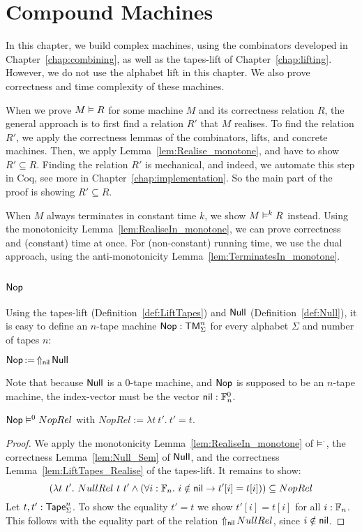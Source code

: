 \chapter{Compound Machines}
\label{chap:compound}

In this chapter, we build complex machines, using the combinators developed in Chapter~\ref{chap:combining}, as well as the tapes-lift of
Chapter~\ref{chap:lifting}.  However, we do not use the alphabet lift in this chapter.  We also prove correctness and time complexity of these
machines.

When we prove $M \mathrel{\vDash} R$ for some machine $M$ and its correctness relation $R$, the general approach is to first find a relation $R'$ that $M$
realises.  To find the relation $R'$, we apply the correctness lemmas of the combinators, lifts, and concrete machines.  Then, we apply
Lemma~\ref{lem:Realise_monotone}, and have to show $R' \subseteq R$.  Finding the relation $R'$ is mechanical, and indeed, we automate this step in
Coq, see more in Chapter~\ref{chap:implementation}.  So the main part of the proof is showing $R' \subseteq R$.

When $M$ always terminates in constant time $k$, we show $M \mathrel{\vDash^{k}} R$ instead.  Using the monotonicity Lemma~\ref{lem:RealiseIn_monotone}, we
can prove correctness and (constant) time at once.  For (non-constant) running time, we use the dual approach, using the anti-monotonicity
Lemma~\ref{lem:TerminatesIn_monotone}.


\section{$\Nop$}
\label{sec:Nop}
%


Using the tapes-lift (Definition~\ref{def:LiftTapes}) and $\mathsf{Null}$ (Definition~\ref{def:Null}), it is easy to define an $n$-tape machine
$\mathsf{Nop} : \mathsf{TM}_\Sigma^n$ for every alphabet $\Sigma$ and number of tapes $n$:
\begin{definition}[$\Nop$][Nop]
  $\mathsf{Nop} \mathop{:=} \mathop{\Uparrow_{\mathsf{nil}}} \mathsf{Null}$
\end{definition}
Note that because $\mathsf{Null}$ is a 0-tape machine, and $\Nop$ is supposed to be an $n$-tape machine, the index-vector must be the vector
$\mathsf{nil} : \mathbb{F}_n^0$.

\begin{lemma}
  \label{lem:Nop_Sem}
  $\mathsf{Nop} \mathrel{\vDash^{0}} NopRel$ with $NopRel := \lambda t~t'.~t'=t$.
\end{lemma}
\begin{proof}
  We apply the monotonicity Lemma~\ref{lem:RealiseIn_monotone} of $\mathrel{\vDash^{\cdot}}$, the correctness Lemma~\ref{lem:Null_Sem} of $\mathsf{Null}$, and the
  correctness Lemma~\ref{lem:LiftTapes_Realise} of the tapes-lift.  It remains to show:
  \[
    \left( \lambda t~t'.~ NullRel~t~t' \land \left(\forall i:\mathbb{F}_n.~i \notin \mathsf{nil} \rightarrow t'[i] = t[i] \right)\right)
    \subseteq NopRel
  \]
  Let $t,t' : \mathsf{Tape}_\Sigma^n$.  To show the equality $t'=t$ we show $t'[i]=t[i]$ for all $i:\mathbb{F}_n$.  This follows with the equality part of the
  relation $\mathop{\Uparrow_{\mathsf{nil}}} NullRel$, since $i \notin \mathsf{nil}$.
\end{proof}

